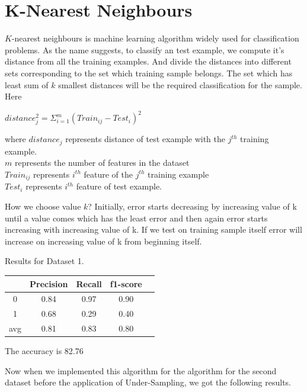 \section{ K-Nearest Neighbours}
\par $K$-nearest neighbours is machine learning algorithm widely used for classification problems. As the name suggests, to classify an test example, we compute it's distance from all the training examples. And divide the distances into different sets corresponding to the set which training sample belongs. The set which has least sum of $k$ smallest distances will be the required classification for the sample.
Here
\begin{center}
	$distance_{j}^{2} = \Sigma_{i=1}^{m}( Train_{ij} - Test_{i} )^{2} $\\	
\end{center}
where $distance_{j}$ represents distance of test example with the $j^{th}$ training example.\\
$m$ represents the number of features in the dataset\\
$Train_{ij}$ represents $i^{th}$ feature of the $j^{th}$ training example\\
$Test_{i}$ represents $i^{th}$ feature of test example.


\par How we choose value $k$?
Initially, error starts decreasing by increasing value of k until a value comes which has the least error and then again error starts increasing with increasing value of k. If we test on training sample itself error will increase on increasing value of k from beginning itself. ~\cite{guo2003knn}
 \par Results for Dataset 1.
\begin{center}
\begin{tabular}{| c | c | c | c | c |}
\hline
    & Precision & Recall & f1-score \\
\hline
0 & 0.84 & 0.97 & 0.90 \\
\hline
1 & 0.68 & 0.29 & 0.40 \\
\hline
avg & 0.81 & 0.83 & 0.80 \\
\hline
\end{tabular}
\end{center}
\begin{center}
The accuracy is 82.76%
\end{center}
Now when we implemented this algorithm for the algorithm for the second dataset before the application of Under-Sampling, we got the following results.

